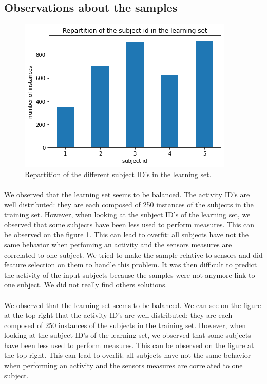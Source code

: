 \documentclass[a4paper, 11pt, oneside]{article}
\begin{document}
\subsection{Observations about the samples}

\begin{figure}[H]
\center
\includegraphics[scale = 0.5]{preprocessing/subjects_repartition.png}
\caption{Repartition of the different subject ID's in the learning set.}
\label{subject_repartition}
\end{figure}

\paragraph{}We observed that the learning set seems to be balanced. The activity ID's are well distributed: they are each composed of 250 instances of the subjects in the training set. However, when looking at the subject ID's of the learning set, we observed that some subjects have been less used to perform measures. This can be observed on the figure \ref{subject_repartition}.
This can lead to overfit: all subjects have not the same behavior when perfoming an activity and the sensors measures are correlated to one subject. We tried to make the sample relative to sensors and did feature selection on them to handle this problem. It was then difficult to predict the activity of the input subjects because the samples were not anymore link to one subject. We did not really find others solutions.

\paragraph{}We observed that the learning set seems to be balanced. We can see on the figure at the top right that the activity ID's are well distributed: they are each composed of 250 instances of the subjects in the training set. However, when looking at the subject ID's of the learning set, we observed that some subjects have been less used to perform measures. This can be observed on the figure at the top right.
This can lead to overfit: all subjects have not the same behavior when performing an activity and the sensors measures are correlated to one subject.
\end{document}
